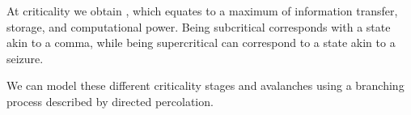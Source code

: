 \documentclass[12pt, a4paper, oneside, openright, titlepage]{book}
\begin{document}
At criticality we obtain , which equates to a maximum of information transfer, storage, and computational power. Being subcritical corresponds with a state akin to a comma, while being supercritical can correspond to a state akin to a seizure.

\begin{rmk}
    We can model these different criticality stages and avalanches using a branching process described by directed percolation.
\end{rmk}




\begin{appendices}


\end{appendices}
\end{document}

